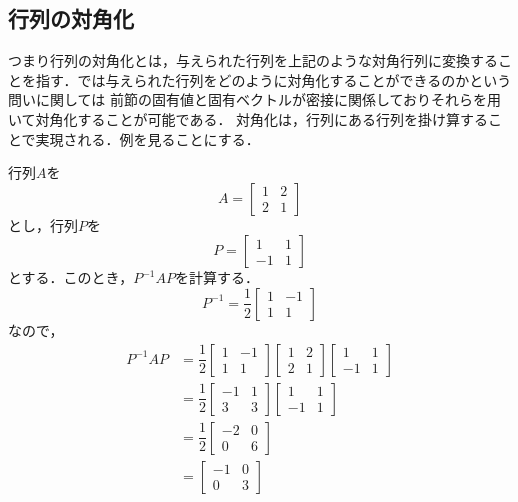 \documentclass[a4paper,12pt,autodetect-engine,dvipdfmx]{jsarticle}
\theoremstyle{definition}
\begin{document}
\subsection{行列の対角化}
つまり行列の対角化とは，与えられた行列を上記のような対角行列に変換することを指す．では与えられた行列をどのように対角化することができるのかという問いに関しては
前節の固有値と固有ベクトルが密接に関係しておりそれらを用いて対角化することが可能である．
対角化は，行列にある行列を掛け算することで実現される．例を見ることにする．

行列$A$を
\begin{equation*}
    A=
    \begin{bmatrix}
        1 & 2\\
        2 & 1
    \end{bmatrix}
\end{equation*}
とし，行列$P$を
\begin{equation*}
    P=
    \begin{bmatrix}
        1 & 1\\
        -1 & 1
    \end{bmatrix}
\end{equation*}
とする．このとき，$P^{-1}AP$を計算する．
\begin{equation*}
    P^{-1}=
    \dfrac{1}{2}
    \begin{bmatrix}
        1 & -1\\
        1 & 1
    \end{bmatrix}
\end{equation*}
なので，
\begin{align*}
    P^{-1}AP&=
    \dfrac{1}{2}
    \begin{bmatrix}
    1 & -1\\
    1 & 1    
    \end{bmatrix}
    \begin{bmatrix}
        1 & 2\\
        2 & 1
    \end{bmatrix}
    \begin{bmatrix}
        1 & 1\\
        -1 & 1
    \end{bmatrix}\\
    &=\dfrac{1}{2}
    \begin{bmatrix}
        -1 & 1\\
        3 & 3
    \end{bmatrix}
    \begin{bmatrix}
        1 & 1\\
        -1 & 1
    \end{bmatrix}\\
    &=\dfrac{1}{2}
    \begin{bmatrix}
        -2 & 0\\
        0 & 6
    \end{bmatrix}\\
    &=
    \begin{bmatrix}
        -1 & 0\\
        0 & 3
    \end{bmatrix}
\end{align*}
\end{document}
